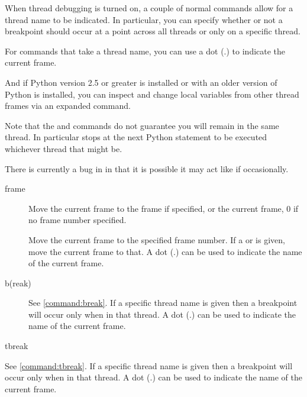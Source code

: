 When thread debugging is turned on, a couple of normal 
commands allow for a thread name to be indicated. In particular, you
can specify whether or not a breakpoint should occur at a point across
all threads or only on a specific thread. 

For commands that take a thread name, you can use a dot (.) to
indicate the current frame.

And if Python version 2.5 or greater is installed or
with an older version of Python is installed, you can inspect and change
local variables from other thread frames via an expanded 
command.

Note that the  and  commands do not guarantee
you will remain in the same thread. In particular  stops at
the next Python statement to be executed whichever thread that might
be.

There is currently a bug in  in that it is possible it may
act like  if occasionally.

\begin{description}
\item[frame  ]

Move the current frame to the frame  if specified, or the
current frame, 0 if no frame number specified.

Move the current frame to the specified frame number. If a
 or is given, move the current
frame to that. A dot (.) can be used to indicate the name of the
current frame.

\item[b(reak)
  ]
See \ref{command:break}. If a specific thread name is given then a
  breakpoint will occur only when in that thread. A dot (.) can be
  used to indicate the name of the current frame.

\item[tbreak
  ]
\end{description}
See \ref{command:tbreak}. If a specific thread name is given then a
  breakpoint will occur only when in that thread. A dot (.) can be
  used to indicate the name of the current frame.

